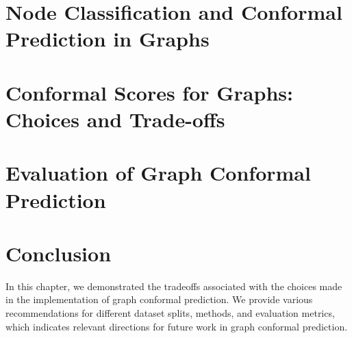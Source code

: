 \section{Node Classification and Conformal Prediction in Graphs}


\section{Conformal Scores for Graphs: Choices and Trade-offs}
\label{chp:graphConformal:sec:conformal_scores_tradeoffs}


\section{Evaluation of Graph Conformal Prediction}


\section{Conclusion}
In this chapter, we demonstrated the tradeoffs associated with the choices made in the implementation of graph conformal prediction.
We provide various recommendations for different dataset splits, methods, and evaluation metrics, which indicates relevant directions for future work in graph conformal prediction.

\begin{subappendices}
    
\end{subappendices}
